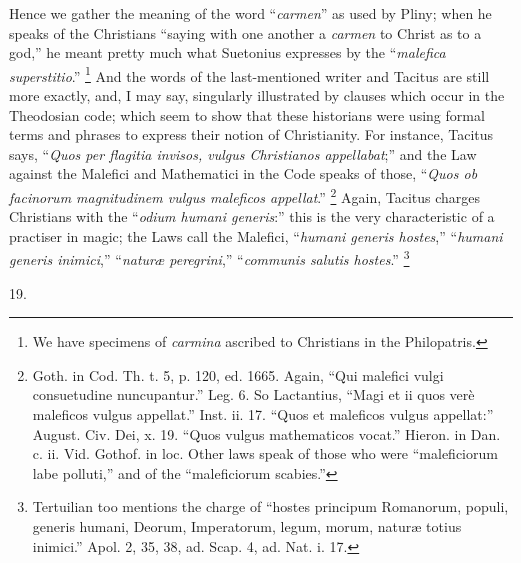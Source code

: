 Hence we gather the meaning of the word ``\emph{carmen}''
as used by Pliny; when he speaks of the Christians
``saying with one another a \emph{carmen} to Christ
as to a god,'' he meant pretty much what Suetonius
expresses by the ``\emph{malefica superstitio}.''
\footnote{We have specimens of \emph{carmina}
ascribed to Christians in the Philopatris.}
And the words of the last-mentioned writer and Tacitus
are still more exactly, and, I may say, singularly
illustrated by clauses which occur in the Theodosian
code; which seem to show that these historians were using
formal terms and phrases to express their notion of
Christianity. For instance, Tacitus says, ``\emph{Quos
per flagitia invisos, vulgus Christianos appellabat};''
and the Law against the Malefici and Mathematici in the
Code speaks of those, ``\emph{Quos ob facinorum
magnitudinem vulgus maleficos appellat}.'' \footnote{Goth. in Cod. Th. t. 5, p.
120, ed. 1665. Again, ``Qui malefici vulgi
consuetudine nuncupantur.'' Leg. 6. So Lactantius,
``Magi et ii quos verè maleficos vulgus
appellat.'' Inst. ii. 17. ``Quos et maleficos
vulgus appellat:'' August. Civ. Dei, x. 19.
``Quos vulgus mathematicos vocat.'' Hieron. in
Dan. c. ii. Vid. Gothof. in loc. Other laws speak of
those who were ``maleficiorum labe polluti,'' and
of the ``maleficiorum scabies.''}
Again, Tacitus charges Christians with the ``\emph{odium
humani generis}:'' this is the very characteristic
of a practiser in magic; the Laws call the Malefici,
``\emph{humani generis hostes},'' ``\emph{humani
generis inimici},'' ``\emph{naturæ peregrini},''
``\emph{communis salutis hostes}.'' \footnote{Tertuilian too mentions the
charge of ``hostes principum Romanorum, populi,
generis humani, Deorum, Imperatorum, legum, morum, naturæ totius inimici.'' Apol. 2, 35, 38, ad. Scap.
4, ad. Nat. i. 17.}

19.

